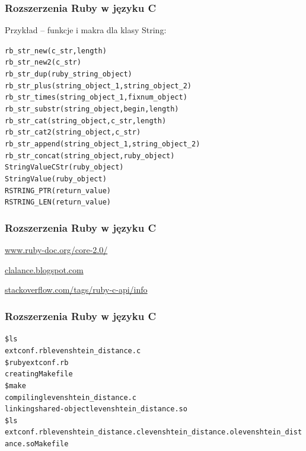 \documentclass{beamer}
\begin{document}
  \begin{frame}
    \frametitle{Rozszerzenia Ruby w języku C}
    Przykład -- funkcje i makra dla klasy String:
    \begin{alltt}
      rb\_str\_new(c\_str, length) \\
      rb\_str\_new2(c\_str) \\
      rb\_str\_dup(ruby\_string\_object) \\
      rb\_str\_plus(string\_object\_1, string\_object\_2) \\
      rb\_str\_times(string\_object\_1, fixnum\_object) \\
      rb\_str\_substr(string\_object, begin, length) \\
      rb\_str\_cat(string\_object, c\_str, length) \\
      rb\_str\_cat2(string\_object, c\_str) \\
      rb\_str\_append(string\_object\_1, string\_object\_2) \\
      rb\_str\_concat(string\_object, ruby\_object) \\
      StringValueCStr(ruby\_object) \\
      StringValue(ruby\_object) \\
      RSTRING\_PTR(return\_value) \\
      RSTRING\_LEN(return\_value)
    \end{alltt}
  \end{frame}

  \begin{frame}
    \frametitle{Rozszerzenia Ruby w języku C}
    \begin{center}
      \href{http://www.ruby-doc.org/core-2.0/}{www.ruby-doc.org/core-2.0/}


      \href{http://clalance.blogspot.com/2011/01/writing-ruby-extensions-in-c-part-1.html}{clalance.blogspot.com}


      \href{http://stackoverflow.com/tags/ruby-c-api/info}{stackoverflow.com/tags/ruby-c-api/info}
    \end{center}
  \end{frame}

  \begin{frame}
    \frametitle{Rozszerzenia Ruby w języku C}
    \begin{alltt}
      \$ ls \\
      extconf.rb  levenshtein\_distance.c \\
      \$ ruby extconf.rb \\
      creating Makefile \\
      \$ make \\
      compiling levenshtein\_distance.c \\
      linking shared-object levenshtein\_distance.so \\
      \$ ls \\
      extconf.rb  levenshtein\_distance.c  levenshtein\_distance.o  levenshtein\_distance.so  Makefile
    \end{alltt}
  \end{frame}
\end{document}
